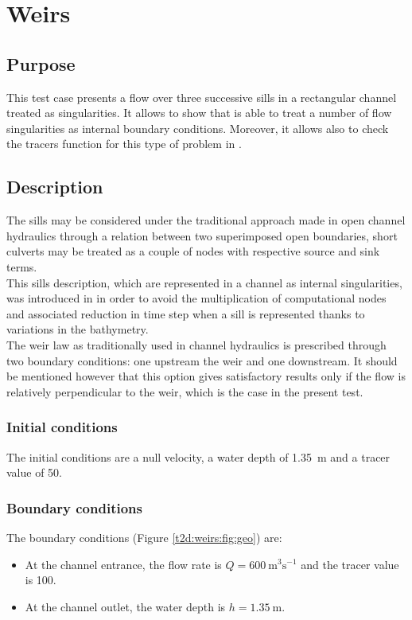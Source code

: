 \chapter{Weirs}

\section{Purpose}
This test case presents a flow over three successive sills in
a rectangular channel treated as singularities. It allows to show
that  is able to treat a number of flow singularities
as internal boundary conditions. Moreover, it allows also to check
the tracers function for this type of problem in .

\section{Description}

The sills may be considered under the traditional approach made
in open channel hydraulics through a relation between two superimposed
open boundaries, short culverts may be treated as a couple of nodes
 with respective source and sink terms.\\
 
This sills description, which are represented in a channel as internal
singularities, was introduced in  in order to avoid the
multiplication of computational nodes and associated reduction in time
step when a sill is represented thanks to variations in the bathymetry.\\
The weir law as traditionally used in channel hydraulics is prescribed
through two boundary conditions: one upstream the weir and one downstream.
It should be mentioned however that this option gives satisfactory results
only if the flow is relatively perpendicular to the weir, which is
the case in the present test.

\subsection{Initial conditions}

The initial conditions are a null velocity,
a water depth of 1.35~m and a tracer value of 50.

\subsection{Boundary conditions}

The boundary conditions (Figure \ref{t2d:weirs:fig:geo}) are:
\begin{itemize}
\item At the channel entrance, the flow rate is
$Q = 600~\text{m}^3\text{s}^{-1}$ and the tracer value is 100.
\item At the channel outlet, the water depth is
$h=1.35~\text{m}$.
\end{itemize}

